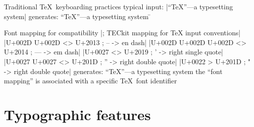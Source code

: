 \item Traditional \TeX\ keyboarding practices
\subitem typical input:\hfil\break
 |``\TeX''---a typesetting system|
\subitem generates: {\red ``\TeX''---a typesetting system}
\=
\item Font mapping for compatibility\hfil\break
{\obeylines%
|; TECkit mapping for TeX input conventions|
|U+002D U+002D        <> U+2013 ; -- -> en dash|
|U+002D U+002D U+002D <> U+2014 ; --- -> em dash|
|U+0027         <>  U+2019 ; ' -> right single quote|
|U+0027 U+0027  <>  U+201D ; '' -> right double quote|
|U+0022          >  U+201D ; " -> right double quote|
}
\medskip
\subitem generates: {\red “\TeX”—a typesetting system}
\subitem the “font mapping” is associated with a specific \TeX\ font identifier

\bigskip
{}

\section{Typographic features}

